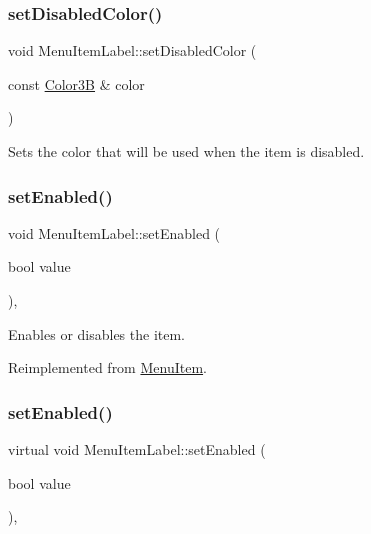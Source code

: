 \subsubsection{\texorpdfstring{set\+Disabled\+Color()}{setDisabledColor()}\hspace{0.1cm}{\footnotesize\ttfamily [2/2]}}
{\footnotesize\ttfamily void Menu\+Item\+Label\+::set\+Disabled\+Color (\begin{DoxyParamCaption}\item[{const \hyperlink{structColor3B}{Color3B} \&}]{color }\end{DoxyParamCaption})\hspace{0.3cm}{\ttfamily [inline]}}

Sets the color that will be used when the item is disabled. \mbox{\label{classMenuItemLabel_a7297a6a7bf9e8f84d6cc783d4604adfd}} 
\subsubsection{\texorpdfstring{set\+Enabled()}{setEnabled()}\hspace{0.1cm}{\footnotesize\ttfamily [1/2]}}
{\footnotesize\ttfamily void Menu\+Item\+Label\+::set\+Enabled (\begin{DoxyParamCaption}\item[{bool}]{value }\end{DoxyParamCaption})\hspace{0.3cm}{\ttfamily [override]}, {\ttfamily [virtual]}}

Enables or disables the item. 

Reimplemented from \hyperlink{classMenuItem_abe370fd6258192233b6bd9534344773b}{Menu\+Item}.

\mbox{\label{classMenuItemLabel_afec86371e192df5410720aeb94cbc12e}} 
\subsubsection{\texorpdfstring{set\+Enabled()}{setEnabled()}\hspace{0.1cm}{\footnotesize\ttfamily [2/2]}}
{\footnotesize\ttfamily virtual void Menu\+Item\+Label\+::set\+Enabled (\begin{DoxyParamCaption}\item[{bool}]{value }\end{DoxyParamCaption})\hspace{0.3cm}{\ttfamily [override]}, {\ttfamily [virtual]}}

